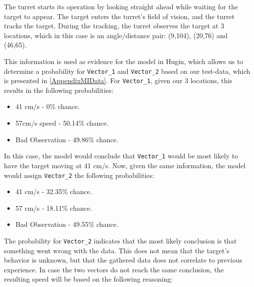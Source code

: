 The turret starts its operation by looking straight ahead while waiting for the
target to appear. The target enters the turret's field of vision, and the turret
tracks the target. During the tracking, the turret observes the target at 3
locations, which in this case is an angle/distance pair: (9,104), (20,76) and
(46,65).\nl

This information is used as evidence for the model in Hugin, which allows
us to determine a probability for \texttt{Vector\_1} and \texttt{Vector\_2}
based on our test-data, which is presented in \autoref{AppendixMIData}. For
\texttt{Vector\_1}, given our 3 locations, this results in the following
probabilities:

\begin{itemize}
  \item 41 cm/s - 0\% chance.
  \item 57cm/s speed - 50.14\% chance.
  \item Bad Observation - 49.86\% chance.
\end{itemize}

In this case, the model would conclude that \texttt{Vector\_1} would be most
likely to have the target moving at 41 cm/s. Now, given the same
information, the model would assign \texttt{Vector\_2} the following probabilities:

\begin{itemize}
  \item 41 cm/s - 32.35\% chance.
  \item 57 cm/s - 18.11\% chance.
  \item Bad Observation - 49.55\% chance.
\end{itemize}

The probability for \texttt{Vector\_2} indicates that the most likely conclusion
is that something went wrong with the data. This does not mean that the target's
behavior is unknown, but that the gathered data does not correlate to previous
experience. In case the two vectors do not reach the same conclusion, the
resulting speed will be based on the following reasoning:

